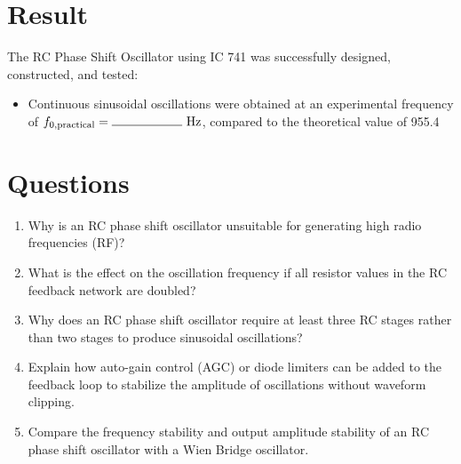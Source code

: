 %

\section{Result}
The RC Phase Shift Oscillator using IC 741 was successfully designed, constructed, and tested:
\begin{itemize}
	\item Continuous sinusoidal oscillations were obtained at an experimental frequency of $f_{0,\text{practical}} = \rule{2cm}{0.15mm}\text{ Hz}$, compared to the theoretical value of \SI{955.4}{} %
\end{itemize}

\section{Questions}
\begin{enumerate}
	\item Why is an RC phase shift oscillator unsuitable for generating high radio frequencies (RF)?
	\item What is the effect on the oscillation frequency if all resistor values in the RC feedback network are doubled?
	\item Why does an RC phase shift oscillator require at least three RC stages rather than two stages to produce sinusoidal oscillations?
	\item Explain how auto-gain control (AGC) or diode limiters can be added to the feedback loop to stabilize the amplitude of oscillations without waveform clipping.
	\item Compare the frequency stability and output amplitude stability of an RC phase shift oscillator with a Wien Bridge oscillator.
\end{enumerate}